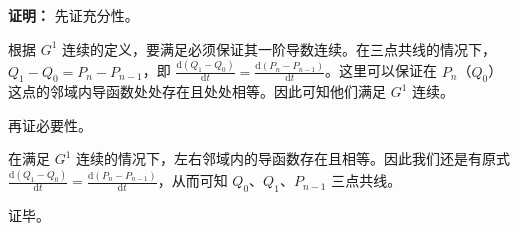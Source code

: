 \documentclass[UTF8]{ctexart}
\begin{document}
\textbf{证明：}
先证充分性。

根据 $G^1$ 连续的定义，要满足必须保证其一阶导数连续。在三点共线的情况下，$Q_1 - Q_0 = P_n - P_{n-1}$，即 $\frac{\mathrm{d} (Q_1 - Q_0)} {\mathrm{d} t} = \frac{\mathrm{d} (P_n - P_{n-1})} {\mathrm{d} t}$。这里可以保证在 $P_n$（$Q_0$）这点的邻域内导函数处处存在且处处相等。因此可知他们满足 $G^1$ 连续。
\newline

再证必要性。

在满足 $G^1$ 连续的情况下，左右邻域内的导函数存在且相等。因此我们还是有原式 $\frac{\mathrm{d} (Q_1 - Q_0)} {\mathrm{d} t} = \frac{\mathrm{d} (P_n - P_{n-1})} {\mathrm{d} t}$，从而可知 $Q_0$、$Q_1$、$P_{n-1}$ 三点共线。

证毕。
\end{document}
